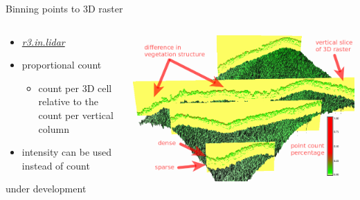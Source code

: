 \documentclass[xcolor={dvipsnames,usenames},beamer,aspectratio=169]{beamer}
\newcommand{\gmodule}[1]{\href{http://grass.osgeo.org/grass71/manuals/#1.html}{\emph{#1}}}
\begin{document}
\begin{frame}{Binning points to 3D raster}

\begin{columns}
\begin{column}{0.28\textwidth}

\begin{itemize}
  \item \gmodule{r3.in.lidar}
  \item proportional count
  \begin{itemize}
    \item count per 3D cell relative to the count per vertical column
  \end{itemize}
  \item intensity can be used instead of count
\end{itemize}

\bigskip
\footnotesize
under development

\end{column}
\begin{column}{0.7\textwidth}

\begin{center}
  \includegraphics[width=\textwidth]{grass/red_green_3d_labels}
\end{center}

\end{column}
\end{columns}

\end{frame}
\end{document}
